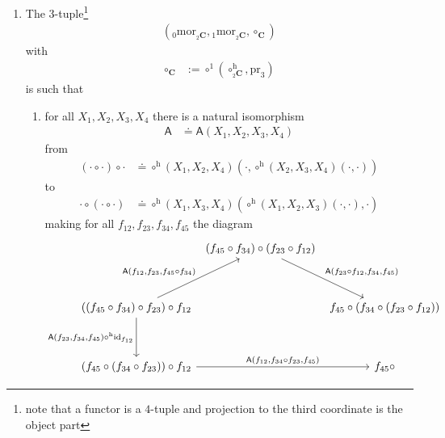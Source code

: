 \begin{enumerate}
\item[(${}_{2}$C0)]
The $3$-tuple\footnote{note that a functor is a $4$-tuple and projection to the third coordinate is the object part}
\begin{align*}
  \left(
    {}_{0}\mathrm{mor}_{{}_{2}\mathbf{C}},
    {}_{1}\mathrm{mor}_{{}_{2}\mathbf{C}},
    \circ_{\mathbf{C}}
  \right)
\end{align*}
with
\begin{align*}
  \circ_{\mathbf{C}}
  &:=
  \circ^{1}
  \left(
    \circ_{{}_{2}\mathbf{C}}^{\textrm{h}},
    \mathrm{pr}_{3}
  \right)
\end{align*}
is such that
\begin{enumerate}
\item[(WC1)]
for all $X_{1},X_{2},X_{3},X_{4}$ there is a natural isomorphism
\begin{align*}
  \mathsf{A}
  &\doteq
  \mathsf{A}
  \left(
    X_{1},
    X_{2},
    X_{3},
    X_{4}
  \right)
\end{align*}
from
\begin{align*}
  \left(
    \cdot
    \circ
    \cdot
  \right)
  \circ
  \cdot
  &\doteq
  \circ^{\textrm{h}}(X_{1},X_{2},X_{4})
  \left(
    \cdot,
    \circ^{\textrm{h}}
    (X_{2},X_{3},X_{4})
    (\cdot,\cdot)
  \right)
\end{align*}
to
\begin{align*}
  \cdot
  \circ
  \left(
    \cdot
    \circ
    \cdot
  \right)
  &\doteq
  \circ^{\textrm{h}}
  (X_{1},X_{3},X_{4})
  \left(
    \circ^{\textrm{h}}
    (X_{1},X_{2},X_{3})
    (\cdot,\cdot),
    \cdot
  \right)
\end{align*}
making for all $f_{12},f_{23},f_{34},f_{45}$ the diagram
\[
\begin{tikzcd}[row sep=3.5em,column sep=0.4em]
  &
  (f_{45} \circ f_{34})
  \circ
  (f_{23} \circ f_{12})
  \arrow{dr}{\mathsf{A}(f_{23} \circ f_{12},f_{34},f_{45})}
  &
  \\
  \left(
    (f_{45} \circ f_{34})
    \circ
    f_{23}
  \right)
  \circ
  f_{12}
  \arrow{ur}{\mathsf{A}(f_{12},f_{23},f_{45} \circ f_{34})}
  \arrow[swap]{d}{\mathsf{A}(f_{23},f_{34},f_{45}) \circ^{\textrm{h}} \mathrm{id}_{f_{12}}}
  &
  &
  f_{45}
  \circ
  \left(
    f_{34}
    \circ
    (f_{23} \circ f_{12})
  \right)
  \\
  \left(
    f_{45}
    \circ
    (f_{34} \circ f_{23})
  \right)
  \circ
  f_{12}
  \arrow{rr}{\mathsf{A}(f_{12},f_{34} \circ f_{23},f_{45})}
  &
  &
  f_{45}
  \circ

\end{tikzcd}\]
\end{enumerate}
\end{enumerate}
